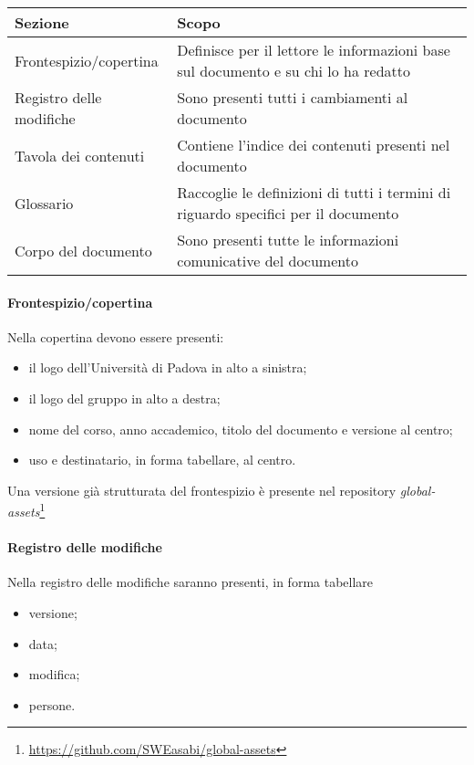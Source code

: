 \begin{center}
    \begin{tabularx}{\linewidth}{l | X }            
        \textbf{Sezione} & \textbf{Scopo}\\
        \hline
        Frontespizio/copertina & Definisce per il lettore le informazioni base sul documento e su chi lo ha redatto\\
        Registro delle modifiche & Sono presenti tutti i cambiamenti al documento\\
        Tavola dei contenuti & Contiene l'indice dei contenuti presenti nel documento \\
        Glossario & Raccoglie le definizioni di tutti i termini di riguardo specifici per il documento\\
        Corpo del documento & Sono presenti tutte le informazioni comunicative del documento\\
    \end{tabularx}
\end{center}

\paragraph{Frontespizio/copertina} Nella copertina devono essere presenti:
\begin{itemize}
    \item il logo dell'Università di Padova in alto a sinistra;
    \item il logo del gruppo in alto a destra;
    \item nome del corso, anno accademico, titolo del documento e versione al centro;
    \item uso e destinatario, in forma tabellare, al centro.
\end{itemize}
Una versione già strutturata del frontespizio è presente nel repository \textit{global-assets}\footnote{\href{https://github.com/SWEasabi/global-assets}{https://github.com/SWEasabi/global-assets}}

\paragraph{Registro delle modifiche} Nella registro delle modifiche saranno presenti, in forma tabellare
\begin{itemize}
    \item versione;
    \item data;
    \item modifica;
    \item persone.
\end{itemize}

